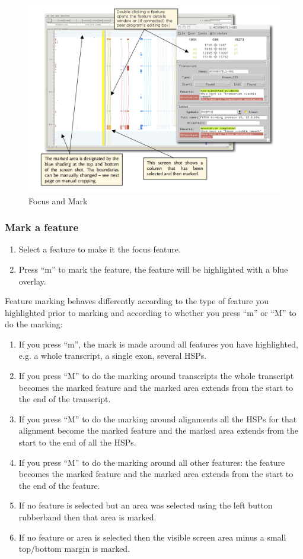 \documentclass[letterpaper]{article}
\begin{document}
\begin{figure}
\centering
\color[rgb]{0.30980393,0.5058824,0.7411765}
\includegraphics[width=15.231cm]{img_focus_and_mark.png}
\caption{Focus and Mark}
\label{img_focus_and_mark}
\end{figure}

\subsubsection{Mark a feature}
\begin{enumerate}
\item Select a feature to make it the focus feature.
\item Press ``m'' to mark the feature, the feature will be highlighted with a blue overlay.
\end{enumerate}

Feature marking behaves differently according to the type of feature you highlighted prior to marking and according to whether you press ``m'' or ``M'' to do the marking:

\begin{enumerate}
\item  If you press ``m'', the mark is made around all features you have highlighted, e.g. a whole transcript, a single exon, several HSPs.
\item  If you press ``M'' to do the marking around transcripts the whole transcript becomes the marked feature and the marked area extends from the start to the end of the transcript.
\item  If you press ``M'' to do the marking around alignments all the HSPs for that alignment become the marked feature and the marked area extends from the start to the end of all the HSPs.
\item  If you press ``M'' to do the marking around all other features: the feature becomes the marked feature and the marked area extends from the start to the end of the feature.
\item  If no feature is selected but an area was selected using the left button rubberband then that area is marked.
\item  If no feature or area is selected then the visible screen area minus a small top/bottom margin is marked.
\end{enumerate}
\end{document}
